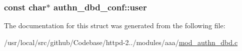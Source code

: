 \subsubsection[{\texorpdfstring{user}{user}}]{\setlength{\rightskip}{0pt plus 5cm}const char$\ast$ authn\+\_\+dbd\+\_\+conf\+::user}\hypertarget{structauthn__dbd__conf_a7cb98cf1226529c727005588954b1273}{}\label{structauthn__dbd__conf_a7cb98cf1226529c727005588954b1273}


The documentation for this struct was generated from the following file\+:\begin{DoxyCompactItemize}
\item 
/usr/local/src/github/\+Codebase/httpd-\/2../modules/aaa/\hyperlink{mod__authn__dbd_8c}{mod\+\_\+authn\+\_\+dbd.\+c}\end{DoxyCompactItemize}
